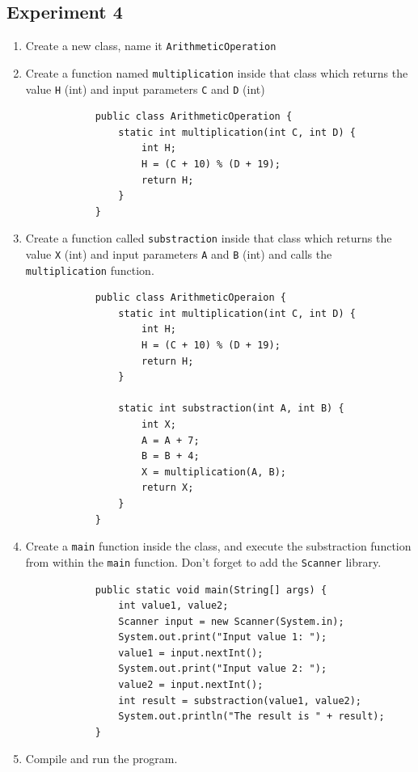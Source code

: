 \documentclass[12pt,titlepage]{article}
\begin{document}
\subsection{Experiment 4}
\begin{enumerate}
    \item Create a new class, name it \texttt{ArithmeticOperation}
    \item {
        Create a function named \texttt{multiplication} inside that class which returns the 
        value \texttt{H} (int) and input parameters \texttt{C} and \texttt{D} (int)

        \begin{verbatim}
            public class ArithmeticOperation {
                static int multiplication(int C, int D) {
                    int H;
                    H = (C + 10) % (D + 19);
                    return H;
                }
            }
        \end{verbatim}
    }
    \item {
        Create a function called \texttt{substraction} inside that class which returns the value
        \texttt{X} (int) and input parameters \texttt{A} and \texttt{B} (int) and calls the
        \texttt{multiplication} function.

        \begin{verbatim}
            public class ArithmeticOperaion {
                static int multiplication(int C, int D) {
                    int H;
                    H = (C + 10) % (D + 19);
                    return H;
                }

                static int substraction(int A, int B) {
                    int X;
                    A = A + 7;
                    B = B + 4;
                    X = multiplication(A, B);
                    return X;
                }
            }
        \end{verbatim}
    }
    \item {
        Create a \texttt{main} function inside the class, and execute the substraction function from
        within the \texttt{main} function. Don't forget to add the \texttt{Scanner} library.

        \begin{verbatim}
            public static void main(String[] args) {
                int value1, value2;
                Scanner input = new Scanner(System.in);
                System.out.print("Input value 1: ");
                value1 = input.nextInt();
                System.out.print("Input value 2: ");
                value2 = input.nextInt();
                int result = substraction(value1, value2);
                System.out.println("The result is " + result);
            }
        \end{verbatim}
    }
    \item {
        Compile and run the program.

}
\end{enumerate}
\end{document}
